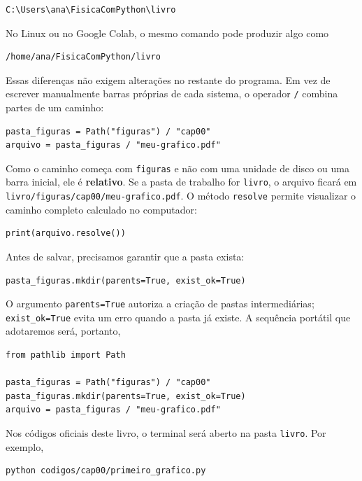 \begin{lstlisting}[style=saidaesperada]
C:\Users\ana\FisicaComPython\livro
\end{lstlisting}

No Linux ou no Google Colab, o mesmo comando pode produzir algo como

\begin{lstlisting}[style=saidaesperada]
/home/ana/FisicaComPython/livro
\end{lstlisting}

Essas diferenças não exigem alterações no restante do programa. Em vez de escrever manualmente barras próprias de cada sistema, o operador \texttt{/} combina partes de um caminho:

\begin{lstlisting}
pasta_figuras = Path("figuras") / "cap00"
arquivo = pasta_figuras / "meu-grafico.pdf"
\end{lstlisting}

Como o caminho começa com \texttt{figuras} e não com uma unidade de disco ou uma barra inicial, ele é \textbf{relativo}. Se a pasta de trabalho for \texttt{livro}, o arquivo ficará em \texttt{livro/figuras/cap00/meu-grafico.pdf}. O método \texttt{resolve} permite visualizar o caminho completo calculado no computador:

\begin{lstlisting}
print(arquivo.resolve())
\end{lstlisting}

Antes de salvar, precisamos garantir que a pasta exista:

\begin{lstlisting}
pasta_figuras.mkdir(parents=True, exist_ok=True)
\end{lstlisting}

O argumento \texttt{parents=True} autoriza a criação de pastas intermediárias; \texttt{exist\_ok=True} evita um erro quando a pasta já existe. A sequência portátil que adotaremos será, portanto,

\begin{lstlisting}
from pathlib import Path

pasta_figuras = Path("figuras") / "cap00"
pasta_figuras.mkdir(parents=True, exist_ok=True)
arquivo = pasta_figuras / "meu-grafico.pdf"
\end{lstlisting}

Nos códigos oficiais deste livro, o terminal será aberto na pasta \texttt{livro}. Por exemplo,

\begin{lstlisting}[language={},numbers=none]
python codigos/cap00/primeiro_grafico.py
\end{lstlisting}


